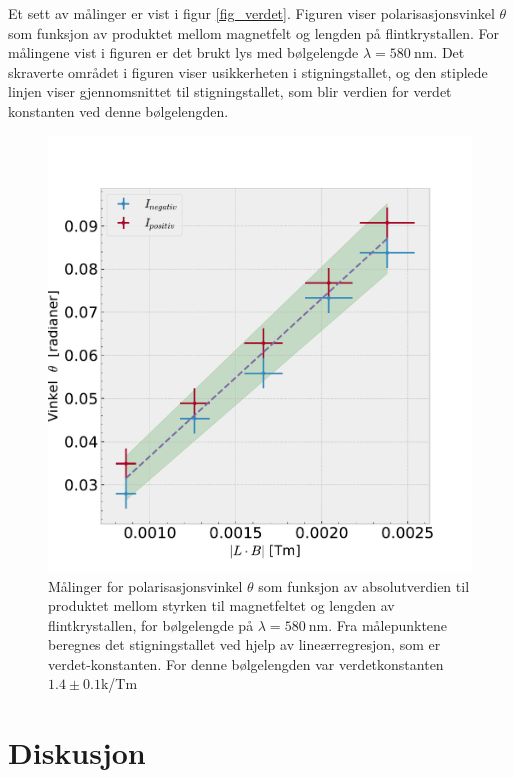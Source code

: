 \documentclass[%
 reprint,
 amsmath,amssymb,
 aps,
]{revtex4-1}
\begin{document}
Et sett av målinger er vist i figur \vref{fig_verdet}. Figuren viser polarisasjonsvinkel $\theta$ som funksjon av produktet mellom magnetfelt og lengden på flintkrystallen. For målingene vist i figuren er det brukt lys med bølgelengde $\lambda=\SI{580}{\nano\meter}$. Det skraverte området i figuren viser usikkerheten i stigningstallet, og den stiplede linjen viser gjennomsnittet til stigningstallet, som blir verdien for verdet konstanten ved denne bølgelengden.
\begin{figure}[ht!]
  \centering
  \includegraphics[scale=0.38]{faraday_effekt.pdf}
  \caption{Målinger for polarisasjonsvinkel $\theta$ som funksjon av absolutverdien til produktet mellom styrken til magnetfeltet og lengden av flintkrystallen, for bølgelengde på $\lambda=\SI{580}{\nano\meter}$. Fra målepunktene beregnes det stigningstallet ved hjelp av lineærregresjon, som er verdet-konstanten. For denne bølgelengden var verdetkonstanten $1.4\pm0.1$k/Tm}
  \label{eksperimentelt_oppsett1}
\end{figure}
\section{Diskusjon}
\end{document}
